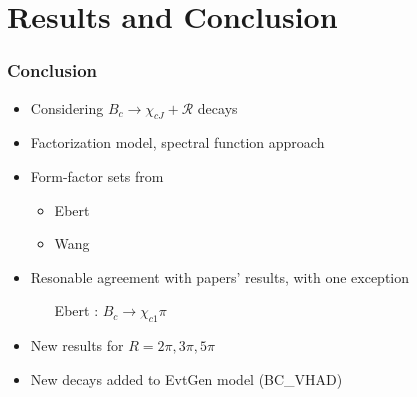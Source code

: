 \documentclass{beamer}
\newcommand{\R}{\mathcal{R}}
\begin{document}
\section{Results and Conclusion}
\begin{frame}
  \frametitle{Conclusion}
  \begin{itemize}
  \item Considering $B_c \to \chi_{cJ}+\R$ decays
  \item Factorization model, spectral function approach
  \item Form-factor sets from
    \begin{itemize}
    \item Ebert
    \item Wang
    \end{itemize}
  \item Resonable agreement with papers' results, with one exception
    \begin{itemize}
    \item [Ebert]: $B_c\to\chi_{c1}\pi$
    \end{itemize}
  \item New results for $R=2\pi, 3\pi, 5\pi$
  \item New decays added to EvtGen model (BC\_VHAD)
  \end{itemize}
  \vspace{1.5cm}
\end{frame}
\end{document}
